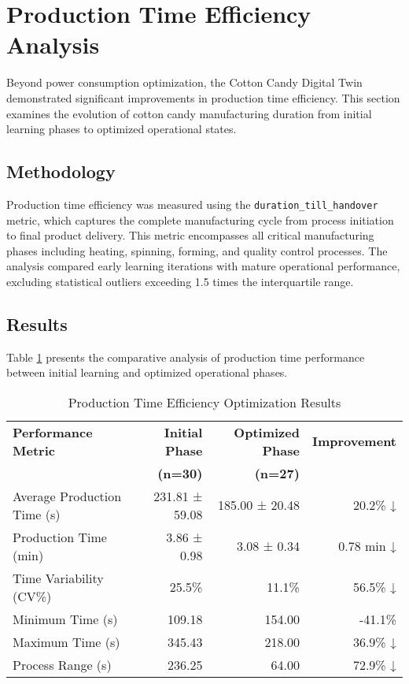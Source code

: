 \section{Production Time Efficiency Analysis}

Beyond power consumption optimization, the Cotton Candy Digital Twin demonstrated significant improvements in production time efficiency. This section examines the evolution of cotton candy manufacturing duration from initial learning phases to optimized operational states.

\subsection{Methodology}

Production time efficiency was measured using the \texttt{duration\_till\_handover} metric, which captures the complete manufacturing cycle from process initiation to final product delivery. This metric encompasses all critical manufacturing phases including heating, spinning, forming, and quality control processes. The analysis compared early learning iterations with mature operational performance, excluding statistical outliers exceeding 1.5 times the interquartile range.

\subsection{Results}

Table \ref{tab:production_efficiency} presents the comparative analysis of production time performance between initial learning and optimized operational phases.

\begin{table}[htbp]
\centering
\caption{Production Time Efficiency Optimization Results}
\label{tab:production_efficiency}
\begin{tabular}{lrrr}
\toprule
\textbf{Performance Metric} & \textbf{Initial Phase} & \textbf{Optimized Phase} & \textbf{Improvement} \\
& \textbf{(n=30)} & \textbf{(n=27)} & \\
\midrule
Average Production Time (s) & 231.81 ± 59.08 & 185.00 ± 20.48 & 20.2\% ↓ \\
Production Time (min) & 3.86 ± 0.98 & 3.08 ± 0.34 & 0.78 min ↓ \\
Time Variability (CV\%) & 25.5\% & 11.1\% & 56.5\% ↓ \\
Minimum Time (s) & 109.18 & 154.00 & -41.1\% \\
Maximum Time (s) & 345.43 & 218.00 & 36.9\% ↓ \\
Process Range (s) & 236.25 & 64.00 & 72.9\% ↓ \\
\bottomrule
\end{tabular}
\end{table}

